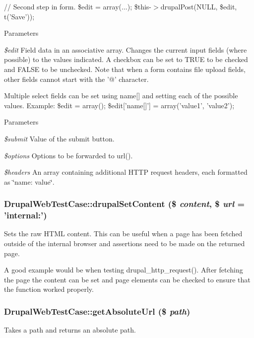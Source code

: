 // Second step in form. \$edit = array(...); \$this-\/$>$drupalPost(NULL, \$edit, t('Save')); 
\begin{DoxyParams}{Parameters}
\item[{\em \$edit}]Field data in an associative array. Changes the current input fields (where possible) to the values indicated. A checkbox can be set to TRUE to be checked and FALSE to be unchecked. Note that when a form contains file upload fields, other fields cannot start with the '@' character.\end{DoxyParams}
Multiple select fields can be set using name\mbox{[}\mbox{]} and setting each of the possible values. Example: \$edit = array(); \$edit\mbox{[}'name\mbox{[}\mbox{]}'\mbox{]} = array('value1', 'value2'); 
\begin{DoxyParams}{Parameters}
\item[{\em \$submit}]Value of the submit button. \item[{\em \$options}]Options to be forwarded to url(). \item[{\em \$headers}]An array containing additional HTTP request headers, each formatted as \char`\"{}name: value\char`\"{}. \end{DoxyParams}
\hypertarget{class_drupal_web_test_case_a75c4e29bdb78951d61993b13985bad1c}{
\subsubsection[{drupalSetContent}]{\setlength{\rightskip}{0pt plus 5cm}DrupalWebTestCase::drupalSetContent (\$ {\em content}, \/  \$ {\em url} = {\ttfamily 'internal:'})}}
\label{class_drupal_web_test_case_a75c4e29bdb78951d61993b13985bad1c}
Sets the raw HTML content. This can be useful when a page has been fetched outside of the internal browser and assertions need to be made on the returned page.

A good example would be when testing drupal\_\-http\_\-request(). After fetching the page the content can be set and page elements can be checked to ensure that the function worked properly. \hypertarget{class_drupal_web_test_case_ab170c2353296a22d88f4c7da58418d57}{
\subsubsection[{getAbsoluteUrl}]{\setlength{\rightskip}{0pt plus 5cm}DrupalWebTestCase::getAbsoluteUrl (\$ {\em path})}}
\label{class_drupal_web_test_case_ab170c2353296a22d88f4c7da58418d57}
Takes a path and returns an absolute path.


